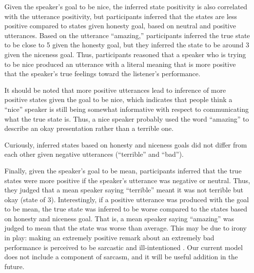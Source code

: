 \documentclass[10pt,letterpaper]{article}
\begin{document}
Given the speaker's goal to be nice, the inferred state positivity is also correlated with the utterance positivity, but participants inferred that the states are less positive compared to states given honesty goal, based on neutral and positive utterances. Based on the utterance ``amazing,'' participants inferred the true state to be close to 5 given the honesty goal, but they inferred the state to be around 3 given the niceness goal. Thus, participants reasoned that a speaker who is trying to be nice produced an utterance  with a literal meaning that is more positive that the speaker's true feelings toward the listener's performance.

It should be noted that more positive utterances lead to inference of more positive states given the goal to be nice, which indicates that people think a ``nice'' speaker is still being somewhat informative with respect to communicating what the true state is. Thus, a nice speaker probably used the word ``amazing'' to describe an okay presentation rather than a terrible one.

Curiously, inferred states based on honesty and niceness goals did not differ from each other given negative utterances (``terrible'' and ``bad''). %

Finally, given the speaker's goal to be mean, participants inferred that the true states were more positive if the speaker's utterance was negative or neutral. Thus, they judged that a mean speaker saying ``terrible'' meant it was not terrible but okay (state of 3). Interestingly, if a positive utterance was produced with the goal to be mean, the true state was inferred to be worse compared to the states based on honesty and niceness goal. That is, a mean speaker saying ``amazing'' was judged to mean that the state was worse than average. This may be due to irony in play: making an extremely positive remark about an extremely bad performance is perceived to be sarcastic and ill-intentioned \cite{colston1997}. Our current model does not include a component of sarcasm, and it will be useful addition in the future.
\end{document}
